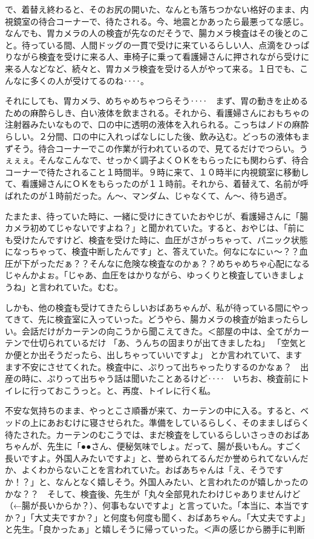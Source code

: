 で、着替え終わると、そのお尻の開いた、なんとも落ちつかない格好のまま、内視鏡室の待合コーナーで、待たされる。今、地震とかあったら最悪ってな感じ。なんでも、胃カメラの人の検査が先なのだそうで、腸カメラ検査はその後とのこと。待っている間、人間ドッグの一貫で受けに来ているらしい人、点滴をひっぱりながら検査を受けに来る人、車椅子に乗って看護婦さんに押されながら受けに来る人などなど、続々と、胃カメラ検査を受ける人がやって来る。１日でも、こんなに多くの人が受けてるのね‥‥。

それにしても、胃カメラ、めちゃめちゃつらそう‥‥　まず、胃の動きを止めるための麻酔らしき、白い液体を飲まされる。それから、看護婦さんにおもちゃの注射器みたいなもので、口の中に透明の液体を入れられる。こっちはノドの麻酔らしい。２分間、口の中に入れっぱなしにした後、飲み込む。どっちの液体もまずそう。待合コーナーでこの作業が行われているので、見てるだけでつらい。うぇぇぇ。そんなこんなで、せっかく調子よくＯＫをもらったにも関わらず、待合コーナーで待たされること１時間半。９時に来て、１０時半に内視鏡室に移動して、看護婦さんにＯＫをもらったのが１１時前。それから、着替えて、名前が呼ばれたのが１時前だった。ん～、マンダム、じゃなくて、ん～、待ち過ぎ。

たまたま、待っていた時に、一緒に受けにきていたおやじが、看護婦さんに「腸カメラ初めてじゃないですよね？」と聞かれていた。すると、おやじは、「前にも受けたんですけど、検査を受けた時に、血圧がさがっちゃって、パニック状態になっちゃって、検査中断したんです」と、答えていた。何なになにぃ～？？血圧が下がっただぁ？？そんなに危険な検査なのかぁ？？めちゃめちゃ心配になるじゃんかよぉ。「じゃあ、血圧をはかりながら、ゆっくりと検査していきましょうね」と言われていた。むむ。

しかも、他の検査も受けてきたらしいおばあちゃんが、私が待っている間にやってきて、先に検査室に入っていった。どうやら、腸カメラの検査が始まったらしい。会話だけがカーテンの向こうから聞こえてきた。＜部屋の中は、全てがカーテンで仕切られているだけ
「あ、うんちの固まりが出てきましたね」
「空気とか便とか出そうだったら、出しちゃっていいですよ」
とか言われていて、ますます不安にさせてくれた。検査中に、ぷりって出ちゃったりするのかなぁ？　出産の時に、ぷりって出ちゃう話は聞いたことあるけど‥‥　いちお、検査前にトイレに行っておこうっと。と、再度、トイレに行く私。

不安な気持ちのまま、やっとこさ順番が来て、カーテンの中に入る。すると、ベッドの上にあおむけに寝させられた。準備をしているらしく、そのまましばらく待たされた。カーテンのむこうでは、まだ検査をしているらしいさっきのおばあちゃんが、先生に「●●さん、便秘気味でしょ。だって、腸が長いもん。すごく長いですよ。外国人みたいですよ」と、誉められてるんだか誉められてないんだか、よくわからないことを言われていた。おばあちゃんは「え、そうですか！？」と、なんとなく嬉しそう。外国人みたい、と言われたのが嬉しかったのかな？？　そして、検査後、先生が「丸々全部見れたわけじゃありませんけど（←腸が長いからか？）、何事もないですよ」と言っていた。「本当に、本当ですか？」「大丈夫ですか？」と何度も何度も聞く、おばあちゃん。「大丈夫ですよ」と先生。「良かったぁ」と嬉しそうに帰っていった。＜声の感じから勝手に判断


